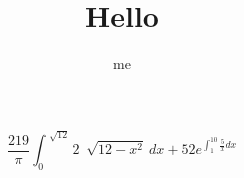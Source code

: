 \documentclass[12pt]{article}
\title{Hello}
\author{me}
\begin{document}
$$
    \frac{219}{\pi}
    \int_{0}^{\sqrt[]{12}}2\ \sqrt[]{12-x^2}\ dx
    +52e^{\int_{1}^{10}\frac{5}{x}dx}
$$
\end{document}
